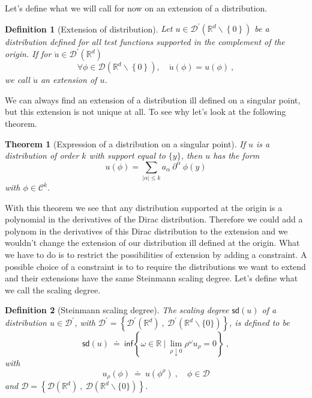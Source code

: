 \documentclass[10pt]{book}
\newcommand{\sd}{\mathsf{sd}}
\newcommand{\abs}[1]{\left|#1\right|}
\renewcommand{\inf}{\mathsf{inf}}
\newcommand{\Ccal}{\mathcal{C}}
\newcommand{\Dcal}{\mathcal{D}}
\newcommand{\Rbb}{\mathbb{R}}
\theoremstyle{break}
\newtheorem{theorem}{Theorem}
\newtheorem{definition}{Definition}
\begin{document}
Let's define what we will call for now on an extension of a distribution.

\begin{definition}[Extension of distribution] 
Let $u \in \Dcal^\prime(\Rbb^d \backslash \left\{ 0\right\} )$ be a distribution defined for all test functions supported in the complement of the origin. If for $\dot{u} \in \Dcal^\prime(\Rbb^d)$
\begin{equation*}
\forall \phi \in \Dcal\left(\Rbb^d \backslash \left\{ 0\right\} \right), \quad \dot{u}(\phi) = u(\phi) \ ,
\end{equation*}
we call $\dot{u}$ an extension of $u$. 
\end{definition}
 
We can always find an extension of a distribution ill defined on a singular point, but this extension is not unique at all. To see why let's look at the following theorem.

\begin{theorem}[Expression of a distribution on a singular point]
 If $u$ is a distribution of order $k$ with support equal to $\{y\}$, then $u$ has the form 
 \begin{equation*}
  u(\phi) = \sum_{\abs{\alpha} \leq k} a_\alpha \ \partial^\alpha \ \phi(y) 
 \end{equation*}
 with $\phi \in \Ccal^k$. 
\end{theorem}

With this theorem we see that any distribution supported at the origin is a polynomial in the derivatives of the Dirac distribution. Therefore we could add a polynom in the derivatives of this Dirac distribution to the extension and we wouldn't change the extension of our distribution ill defined at the origin. What we have to do is to restrict the possibilities of extension by adding a constraint. A possible choice of a constraint is to to require the distributions we want to extend and their extensions have the same Steinmann scaling degree. Let's define what we call the scaling degree.

\begin{definition}[Steinmann scaling degree] 
 The scaling degree $\sd(u)$ of a distribution $u \in \Dcal^\prime$, with $\Dcal^\prime = \left\{\Dcal^\prime(\Rbb^d) \ , \ \Dcal^\prime\left(\Rbb^d \backslash \{0\}\right)  \right\}$, is defined to be
 \begin{equation*}
  \sd(u) \ \doteq \ \inf \left\{ \omega \in \Rbb \ \bigg| \ \lim_{\rho \downarrow 0} \rho^{\omega} u_{\rho} = 0 \right\} \ ,  
 \end{equation*}
 with 
 \begin{equation*}
  u_\rho(\phi) \ \doteq \ u(\phi^\rho) \ , \quad \phi \in \Dcal
 \end{equation*}
 and $\Dcal = \left\{\Dcal(\Rbb^d) \ , \ \Dcal\left(\Rbb^d \backslash \{0\}\right)  \right\}$. 
\end{definition}
\end{document}
